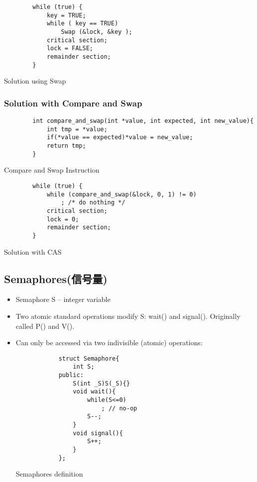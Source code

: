 \begin{code}
    \begin{verbatim}
        while (true) {
            key = TRUE;
            while ( key == TRUE)
                Swap (&lock, &key );
            critical section;
            lock = FALSE;
            remainder section;
        }
    \end{verbatim}
    \caption{Solution using Swap}
\end{code}

\subsubsection{Solution with Compare and Swap}
\begin{code}
    \begin{verbatim}
        int compare_and_swap(int *value, int expected, int new_value){
            int tmp = *value;
            if(*value == expected)*value = new_value;
            return tmp;
        }
    \end{verbatim}
    \caption{Compare and Swap Instruction}
\end{code}

\begin{code}
    \begin{verbatim}
        while (true) {
            while (compare_and_swap(&lock, 0, 1) != 0)  
                ; /* do nothing */
            critical section;
            lock = 0;
            remainder section;
        }
    \end{verbatim}
    \caption{Solution with CAS}
\end{code}


\subsection{Semaphores(信号量)}
\begin{itemize}
    \item Semaphore S -- integer variable
    \item Two atomic standard operations modify S: wait() and signal(). 
    \subitem Originally called P() and V(). 
    \item Can only be accessed via two indivisible (atomic) operations:
    \begin{code}
        \begin{verbatim}
            struct Semaphore{
                int S;
            public:
                S(int _S)S(_S){}
                void wait(){
                    while(S<=0)
                        ; // no-op
                    S--;
                }
                void signal(){
                    S++;
                }
            };
        \end{verbatim}
        \caption{Semaphores definition}
    \end{code}
    
\end{itemize}

